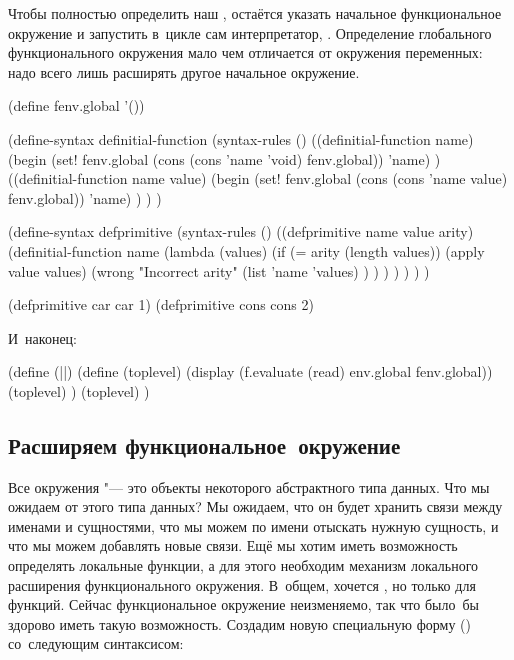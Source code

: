 Чтобы полностью определить наш , остаётся указать начальное функциональное
окружение и запустить в~цикле сам интерпретатор, . Определение
глобального функционального окружения мало чем отличается от окружения
переменных: надо всего лишь расширять другое начальное окружение.

\begin{code:lisp}
(define fenv.global '())

(define-syntax definitial-function
  (syntax-rules ()
    ((definitial-function name)
     (begin (set! fenv.global (cons (cons 'name 'void) fenv.global))
            'name) )
    ((definitial-function name value)
     (begin (set! fenv.global (cons (cons 'name value) fenv.global))
            'name) ) ) )

(define-syntax defprimitive
  (syntax-rules ()
    ((defprimitive name value arity)
     (definitial-function name
       (lambda (values)
         (if (= arity (length values))
             (apply value values)
             (wrong "Incorrect arity"
              (list 'name 'values) ) ) ) ) ) ) )

(defprimitive car car 1)
(defprimitive cons cons 2)
\end{code:lisp}

\noindent
И~наконец:

\begin{code:lisp}
(define (||)
  (define (toplevel)
    (display (f.evaluate (read) env.global fenv.global))
    (toplevel) )
  (toplevel) )
\end{code:lisp}


\subsection{Расширяем функциональное~окружение}%
\label{lisp1-2-omega/lisp2/ssect:enriching}

Все окружения "--- это объекты некоторого абстрактного типа данных. Что мы
ожидаем от этого типа данных? Мы ожидаем, что он будет хранить связи между
именами и сущностями, что мы можем по имени отыскать нужную сущность, и что мы
можем добавлять новые связи. Ещё мы хотим иметь возможность определять локальные
функции, а для этого необходим механизм локального расширения функционального
окружения. В~общем, хочется , но только для функций. Сейчас
функциональное окружение неизменяемо, так что было~бы здорово иметь такую
возможность. Создадим новую специальную форму  ()
со~следующим синтаксисом:


